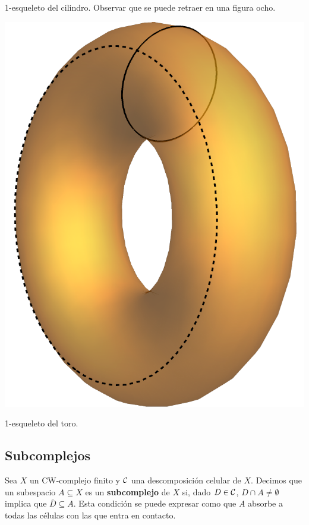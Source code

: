 \begin{marginfigure}

\caption[1-esqueleto del cilindro.]{1-esqueleto del cilindro. Observar que se
puede retraer en una figura ocho.}
\end{marginfigure}

\begin{marginfigure}
\includegraphics{Figures/ToroGeneradoresOrden1.pdf}
\caption{1-esqueleto del toro.}
\end{marginfigure}

\subsection{Subcomplejos}
Sea $X$ un CW-complejo finito y $\mathcal{C}$ una descomposición celular de $X$.
Decimos que un subespacio $A \subseteq X$ es un \textbf{subcomplejo} de $X$ si,
dado $D \in \mathcal{C}$, $D\cap A \neq \emptyset$ implica que $\overline{D}
\subseteq A$. Esta condición se puede expresar como que $A$ absorbe a todas
las células con las que entra en contacto.

